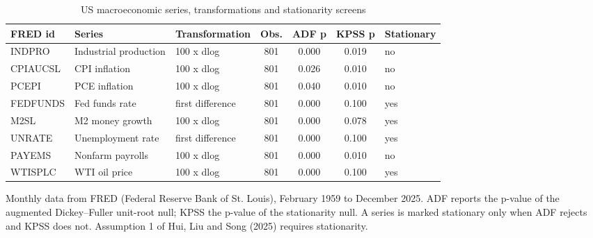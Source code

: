 \begin{table}[htbp]
\centering
\caption{US macroeconomic series, transformations and stationarity screens}
\label{tab:macroseries}
\small
\begin{tabular}{lllcccl}
\toprule
FRED id & Series & Transformation & Obs. & ADF p & KPSS p & Stationary \\
\midrule
INDPRO & Industrial production & 100 x dlog & 801 & 0.000 & 0.019 & no \\
CPIAUCSL & CPI inflation & 100 x dlog & 801 & 0.026 & 0.010 & no \\
PCEPI & PCE inflation & 100 x dlog & 801 & 0.040 & 0.010 & no \\
FEDFUNDS & Fed funds rate & first difference & 801 & 0.000 & 0.100 & yes \\
M2SL & M2 money growth & 100 x dlog & 801 & 0.000 & 0.078 & yes \\
UNRATE & Unemployment rate & first difference & 801 & 0.000 & 0.100 & yes \\
PAYEMS & Nonfarm payrolls & 100 x dlog & 801 & 0.000 & 0.010 & no \\
WTISPLC & WTI oil price & 100 x dlog & 801 & 0.000 & 0.100 & yes \\
\bottomrule
\end{tabular}

\begin{minipage}{\linewidth}\footnotesize
Monthly data from FRED (Federal Reserve Bank of St. Louis), February 1959 to December 2025.  ADF reports the p-value of the augmented Dickey--Fuller unit-root null; KPSS the p-value of the stationarity null.  A series is marked stationary only when ADF rejects and KPSS does not.  Assumption 1 of Hui, Liu and Song (2025) requires stationarity.
\end{minipage}
\end{table}
